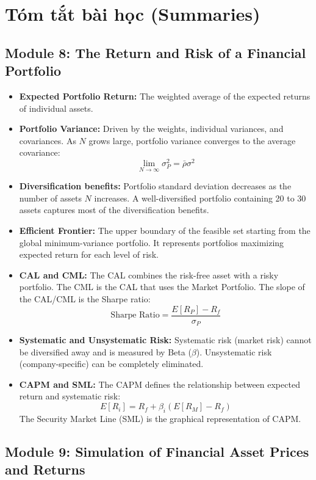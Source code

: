 \chapter{Tóm tắt bài học (Summaries)}
\label{chap:Summaries of Modules}

\section{Module 8: The Return and Risk of a Financial Portfolio}
\label{sec:app_Summary_Module_8}

\begin{itemize}
	\item \textbf{Expected Portfolio Return:} The weighted average of the expected returns of individual assets.
	\item \textbf{Portfolio Variance:} Driven by the weights, individual variances, and covariances. As $N$ grows large, portfolio variance converges to the average covariance:
	      \[
	      \lim_{N \to \infty} \sigma_P^2 = \bar{\rho} \sigma^2
	      \]
	\item \textbf{Diversification benefits:} Portfolio standard deviation decreases as the number of assets $N$ increases. A well-diversified portfolio containing 20 to 30 assets captures most of the diversification benefits.
	\item \textbf{Efficient Frontier:} The upper boundary of the feasible set starting from the global minimum-variance portfolio. It represents portfolios maximizing expected return for each level of risk.
	\item \textbf{CAL and CML:} The CAL combines the risk-free asset with a risky portfolio. The CML is the CAL that uses the Market Portfolio. The slope of the CAL/CML is the Sharpe ratio:
	      \[
	      \text{Sharpe Ratio} = \frac{E[R_P] - R_f}{\sigma_P}
	      \]
	\item \textbf{Systematic and Unsystematic Risk:} Systematic risk (market risk) cannot be diversified away and is measured by Beta ($\beta$). Unsystematic risk (company-specific) can be completely eliminated.
	\item \textbf{CAPM and SML:} The CAPM defines the relationship between expected return and systematic risk:
	      \[
	      E[R_i] = R_f + \beta_i (E[R_M] - R_f)
	      \]
	      The Security Market Line (SML) is the graphical representation of CAPM.
\end{itemize}

\newpage

\section{Module 9: Simulation of Financial Asset Prices and Returns}
\label{sec:app_Summary_Module_9}


